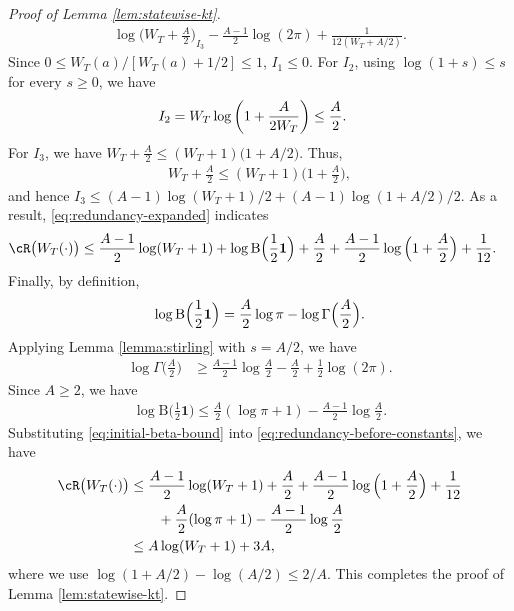 \documentclass[11pt]{article}
\begin{document}
\begin{proof}[Proof of Lemma \ref{lem:statewise-kt}]
\begin{align}
{    \log\Big(W_T+\frac A2\Big)}_{I_3}
    -
    \frac{A-1}{2}\log(2\pi)
    +
    \frac{1}{12(W_T+A/2)}.
    \label{eq:redundancy-expanded}
\end{align}
Since $0\leq
    {W_T(a)}/{[W_T(a)+1/2]}
    \leq1$, $I_1 \le 0$.
For $I_2$, using $\log(1+s)\leq s$ for every $s\geq0$, we have
\begin{align}
    I_2
    &=
    W_T\log\left(1+\frac{A}{2W_T}\right)
    \leq
    \frac A2.
\notag
\end{align}
For $I_3$, we have $ W_T+\frac A2
    \leq
    (W_T+1)\big(1+ A/2\big)$. Thus, 
\begin{align*}
    W_T+\frac A2
    \leq
    (W_T+1)\Big(1+\frac A2\Big),
\end{align*}
and hence $I_3 \le (A-1) \log(W_T+1)/2 + (A-1) \log(1+A/2)/2$. As a result, 
\eqref{eq:redundancy-expanded} indicates
\begin{align}
    \cR\bigl(W_T(\cdot)\bigr)
    &\leq
    \frac{A-1}{2}\log(W_T+1)
    +
    \log\mathrm B\Big(\frac12\mathbf1\Big)
    +
    \frac A2
    +
    \frac{A-1}{2}
    \log\Big(1+\frac A2\Big)
    +
    \frac1{12}.
    \label{eq:redundancy-before-constants}
\end{align}
Finally, by definition,
\begin{align}
\notag
    \log\mathrm B\Big(\frac12\mathbf1\Big)
    =
    \frac A2\log\pi
    -
    \log\Gamma\Big(\frac A2\Big).
\end{align}
Applying Lemma \ref{lemma:stirling} with $s = A/2$, we have
\begin{align*}
    \log\Gamma\Big(\frac A2\Big)
    &\geq
    \frac{A-1}{2}\log\frac A2
    -
    \frac A2
    +
    \frac12\log(2\pi).
\end{align*}
Since $A\geq2$, we have
\begin{align}
    \log\mathrm B\Big(\frac12\mathbf1\Big)
    \leq
    \frac A2(\log\pi+1) - \frac{A-1}{2} \log \frac{A}{2}.
    \label{eq:initial-beta-bound}
\end{align}
Substituting \eqref{eq:initial-beta-bound} into \eqref{eq:redundancy-before-constants}, we have
\begin{align*}
    \cR\bigl(W_T(\cdot)\bigr)
    &\leq
    \frac{A-1}{2}\log(W_T+1)
    +
    \frac A2
    +
    \frac{A-1}{2}
    \log\Big(1+\frac A2\Big)
    +
    \frac1{12}\\
    &\qquad + \frac A2(\log\pi+1) - \frac{A-1}{2} \log \frac{A}{2}\\
    & \le A\log(W_T+1) + 3A,
\end{align*}
where we use $\log(1+A/2) - \log (A/2) \le 2/A$. This completes the proof of Lemma \ref{lem:statewise-kt}.
\end{proof}
\end{document}
